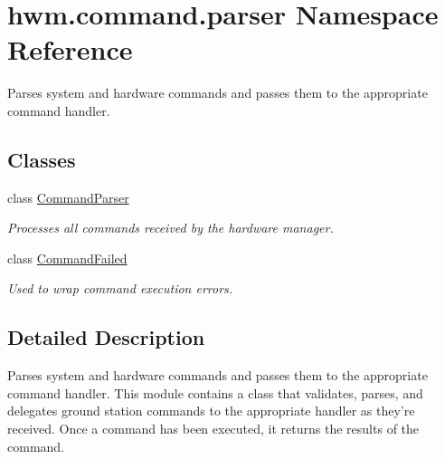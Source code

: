 \hypertarget{namespacehwm_1_1command_1_1parser}{\section{hwm.\-command.\-parser Namespace Reference}
\label{namespacehwm_1_1command_1_1parser}
}


Parses system and hardware commands and passes them to the appropriate command handler.  


\subsection*{Classes}
\begin{DoxyCompactItemize}
\item 
class \hyperlink{classhwm_1_1command_1_1parser_1_1_command_parser}{Command\-Parser}
\begin{DoxyCompactList}\small\item\em Processes all commands received by the hardware manager. \end{DoxyCompactList}\item 
class \hyperlink{classhwm_1_1command_1_1parser_1_1_command_failed}{Command\-Failed}
\begin{DoxyCompactList}\small\item\em Used to wrap command execution errors. \end{DoxyCompactList}\end{DoxyCompactItemize}


\subsection{Detailed Description}
Parses system and hardware commands and passes them to the appropriate command handler. This module contains a class that validates, parses, and delegates ground station commands to the appropriate handler as they're received. Once a command has been executed, it returns the results of the command. 